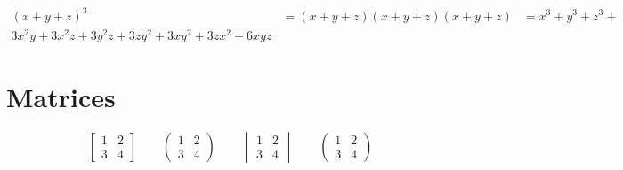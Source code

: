 \documentclass{article}
\begin{document}
\begin{align*}
(x+y+z)^3
&= (x+y+z)(x+y+z)(x+y+z)
&= x^3+y^3+z^3+\\
3x^2y+3x^2z+3y^2z+3zy^2+3xy^2+3zx^2+6xyz
\end{align*}

\section{Matrices}

\[\begin{bmatrix}
1 & 2\\
3 & 4
\end{bmatrix}
\qquad
\begin{pmatrix}
1 & 2\\
3 & 4
\end{pmatrix}
\qquad
\begin{vmatrix}
1 & 2\\
3 & 4
\end{vmatrix}
\qquad
\begin{pmatrix}
1 & 2\\
3 & 4
\end{pmatrix}
\]
\end{document}
